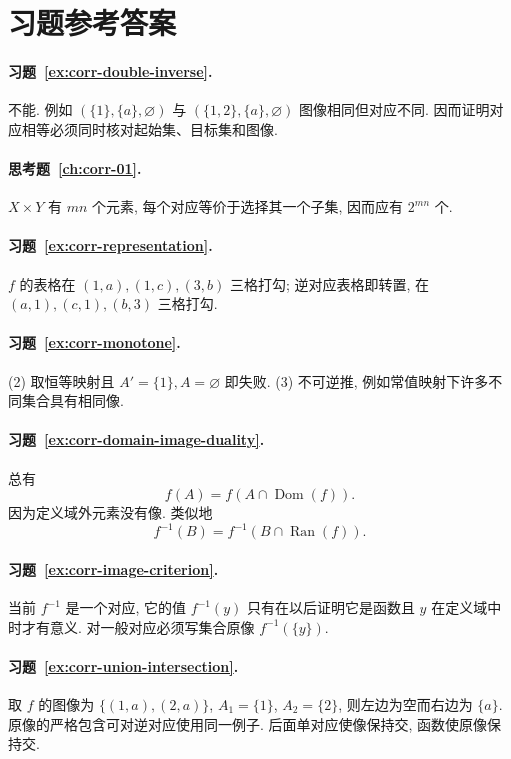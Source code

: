 \documentclass[usesamecnt, thmcnt=section, lang=cn, newtx, 10pt, scheme=chinese]{elegantbook}
\begin{document}
\section{习题参考答案}



\paragraph*{习题~\ref{ex:corr-double-inverse}.}
不能. 例如 $(\{1\},\{a\},\varnothing)$ 与 $(\{1,2\},\{a\},\varnothing)$ 图像相同但对应不同. 因而证明对应相等必须同时核对起始集、目标集和图像.

\paragraph*{思考题~\ref{ch:corr-01}.}
$X\times Y$ 有 $mn$ 个元素, 每个对应等价于选择其一个子集, 因而应有 $2^{mn}$ 个.


\paragraph*{习题~\ref{ex:corr-representation}.}
$f$ 的表格在 $(1,a),(1,c),(3,b)$ 三格打勾; 逆对应表格即转置, 在 $(a,1),(c,1),(b,3)$ 三格打勾.



\paragraph*{习题~\ref{ex:corr-monotone}.}
(2) 取恒等映射且 $A'=\{1\},A=\varnothing$ 即失败. (3) 不可逆推, 例如常值映射下许多不同集合具有相同像.

\paragraph*{习题~\ref{ex:corr-domain-image-duality}.}
总有
\[
 f(A)=f(A\cap\operatorname{Dom}(f)).
\]
因为定义域外元素没有像. 类似地
\[
 f^{-1}(B)=f^{-1}(B\cap\operatorname{Ran}(f)).
\]

\paragraph*{习题~\ref{ex:corr-image-criterion}.}
当前 $f^{-1}$ 是一个对应, 它的值 $f^{-1}(y)$ 只有在以后证明它是函数且 $y$ 在定义域中时才有意义. 对一般对应必须写集合原像 $f^{-1}(\{y\})$.

\paragraph*{习题~\ref{ex:corr-union-intersection}.}
取 $f$ 的图像为 $\{(1,a),(2,a)\}$, $A_1=\{1\}$, $A_2=\{2\}$, 则左边为空而右边为 $\{a\}$. 原像的严格包含可对逆对应使用同一例子. 后面单对应使像保持交, 函数使原像保持交.
\end{document}
